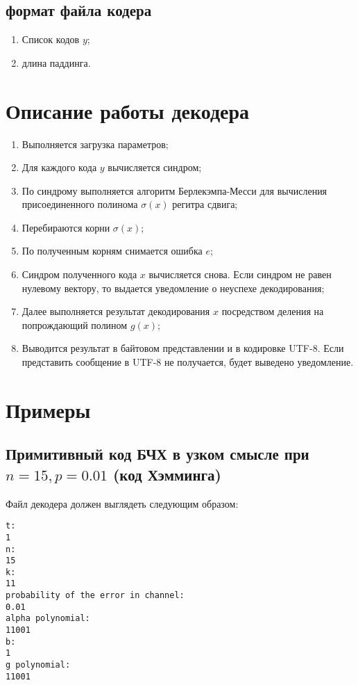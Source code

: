 \documentclass{article}
\begin{document}
\subsection{формат файла кодера}

\begin{enumerate}
\item Список кодов $y$;
\item длина паддинга.
\end{enumerate}

\section{Описание работы декодера}

\begin{enumerate}
\item Выполняется загрузка параметров;
\item Для каждого кода $y$ вычисляется синдром;
\item По синдрому выполняется алгоритм Берлекэмпа-Месси для вычисления присоединенного полинома $\sigma(x)$ регитра сдвига;
\item Перебираются корни $\sigma(x)$;
\item По полученным корням снимается ошибка $e$;
\item Синдром полученного кода $x$ вычисляется снова.
Если синдром не равен нулевому вектору, то выдается уведомление о неуспехе декодирования;
\item Далее выполняется результат декодирования $x$ посредством деления на попрождающий полином $g(x)$;
\item Выводится результат в байтовом представлении и в кодировке UTF-8.
Если представить сообщение в UTF-8 не получается, будет выведено уведомление.
\end{enumerate}

\section{Примеры}

\subsection{Примитивный код БЧХ в узком смысле при $n = 15, p = 0.01$ (код Хэмминга)}

Файл декодера должен выглядеть следующим образом:

\begin{verbatim}
t:
1
n:
15
k:
11
probability of the error in channel:
0.01
alpha polynomial:
11001
b:
1
g polynomial:
11001
\end{verbatim}
\end{document}
